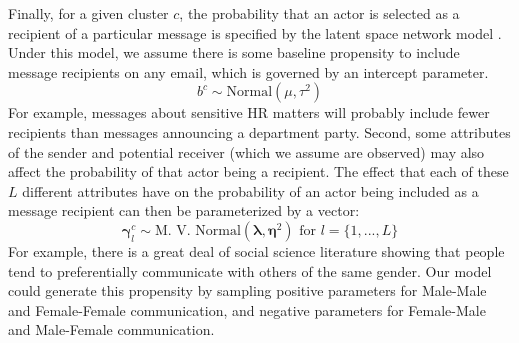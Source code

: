 \documentclass{pnastwo}
\begin{document}
\begin{article}
Finally, for a given cluster $c$, the probability that an actor is selected as a recipient of a particular message is specified by the latent space network model \citep{Hoff2002a}. Under this model, we assume there is some baseline propensity to include message recipients on any email, which is governed by an intercept parameter.
\begin{equation}
	b^{c} \sim \text{Normal}(\mu, \tau^2)
\end{equation} 
For example, messages about sensitive HR matters will probably include fewer recipients than messages announcing a department party. Second, some attributes of the sender and potential receiver (which we assume are observed) may also affect the probability of that actor being a recipient. The effect that each of these $L$ different attributes have on the probability of an actor being included as a message recipient can then be parameterized by a vector: 
\begin{equation}
	\mathbf{\gamma}_l^{c} \sim \text{M. V. Normal}(\mathbf{\lambda}, \mathbf{\eta}^2) \text{ for } l = \{1, ..., L\}
\end{equation}
For example, there is a great deal of social science literature showing that people tend to preferentially communicate with others of the same gender. Our model could generate this propensity by sampling positive parameters for Male-Male and Female-Female communication, and negative parameters for Female-Male and Male-Female communication. 


\end{article}
\end{document}
